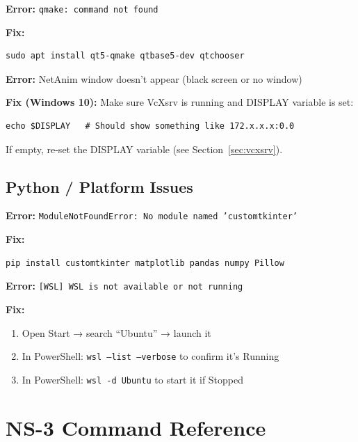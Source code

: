 \documentclass[12pt,a4paper]{article}
\newenvironment{errorbox}
  {\begin{tcolorbox}[
      colback   = dangered!8,
      colframe  = dangered,
      fonttitle = \bfseries,
      title     = \textcolor{dangered}{$\times$\; Error / Fix},
      breakable
  ]}
  {\end{tcolorbox}}
\newcommand{\cmd}[1]{\texttt{\color{codeblue}#1}}
\begin{document}
\begin{errorbox}
\textbf{Error:} \texttt{qmake: command not found}

\textbf{Fix:}
\begin{lstlisting}[style=bash]
sudo apt install qt5-qmake qtbase5-dev qtchooser
\end{lstlisting}
\end{errorbox}

\begin{errorbox}
\textbf{Error:} NetAnim window doesn't appear (black screen or no window)

\textbf{Fix (Windows 10):} Make sure VcXsrv is running and DISPLAY variable is set:
\begin{lstlisting}[style=bash]
echo $DISPLAY   # Should show something like 172.x.x.x:0.0
\end{lstlisting}
If empty, re-set the DISPLAY variable (see Section~\ref{sec:vcxsrv}).
\end{errorbox}

\subsection{Python / Platform Issues}

\begin{errorbox}
\textbf{Error:} \texttt{ModuleNotFoundError: No module named 'customtkinter'}

\textbf{Fix:}
\begin{lstlisting}[style=bash]
pip install customtkinter matplotlib pandas numpy Pillow
\end{lstlisting}
\end{errorbox}

\begin{errorbox}
\textbf{Error:} \texttt{[WSL] WSL is not available or not running}

\textbf{Fix:}
\begin{enumerate}
  \item Open Start → search ``Ubuntu'' → launch it
  \item In PowerShell: \cmd{wsl --list --verbose} to confirm it's Running
  \item In PowerShell: \cmd{wsl -d Ubuntu} to start it if Stopped
\end{enumerate}
\end{errorbox}


\appendix
\section{NS-3 Command Reference}
\end{document}
